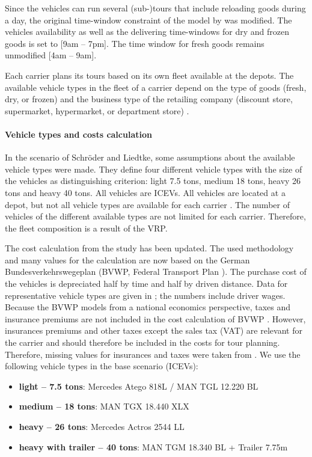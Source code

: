 Since the vehicles can run several (sub-)tours that include reloading goods during a day, the original time-window constraint of the model by \cite{SchroederLiedtke2014FoodDistributionBerlin} was modified.
The vehicles availability as well as the delivering time-windows for dry and frozen goods is set to [9am – 7pm]. 
The time window for fresh goods remains unmodified [4am – 9am]. \cite{MartinsTurnerNagel2019FreightMultipleToursABMTrans}

Each carrier plans its tours based on its own fleet available at the depots. 
The available vehicle types in the fleet of a carrier depend on the type of goods (fresh, dry, or frozen) and the business type of the retailing company (discount store, supermarket, hypermarket, or department store) \cite{SchroederLiedtke2014FoodDistributionBerlin}.

\paragraph*{Vehicle types and costs calculation}
\label{vehicleTypes}
In the scenario of Schröder and Liedtke, some assumptions about the available vehicle types were made. 
They define four different vehicle types with the size of the vehicles as distinguishing criterion: light 7.5 tons, medium 18 tons, heavy 26 tons and heavy 40 tons. All vehicles are ICEVs. 
All vehicles are located at a depot, but not all vehicle types are available for each carrier \cite{SchroederLiedtke2014FoodDistributionBerlin, GablerSchroederEtc2013staedtischerDistributionsverkehr}.
The number of vehicles of the different available types are not limited for each carrier. Therefore, the fleet composition is a result of the VRP.

The cost calculation from the study \cite{SchroederLiedtke2014FoodDistributionBerlin} has been updated.
The used methodology and many values for the calculation are now based on the German Bundesverkehrswegeplan (BVWP, Federal Transport Plan \cite{BMVI2016BVWP2030}).
The purchase cost of the vehicles is depreciated half by time and half by driven distance. 
Data for representative vehicle types are given in \cite{PlancoItpTubs2015FeBerichtBvwpMethodik}; the numbers include driver wages.
Because the BVWP models from a national economics perspective, taxes and insurance premiums are not included in the cost calculation of BVWP \cite{PtvTciMann2016MethodenhandbuchBvwp2030}.
However, insurances premiums and other taxes except the sales tax (VAT) are relevant for the carrier and should therefore be included in the costs for tour planning. 
Therefore, missing values for insurances and taxes were taken from \cite{LastautoOmnibusKatalog2018FzgKosten}.
We use the following vehicle types in the base scenario (ICEVs):
\begin{itemize}[]
	\item \textbf{light -- 7.5 tons}: Mercedes Atego 818L / MAN TGL 12.220 BL
	\item \textbf{medium -- 18 tons}: MAN TGX 18.440 XLX
	\item \textbf{heavy -- 26 tons}: Mercedes Actros 2544 LL
	\item \textbf{heavy with trailer -- 40 tons}: MAN TGM 18.340 BL + Trailer 7.75m
\end{itemize}

